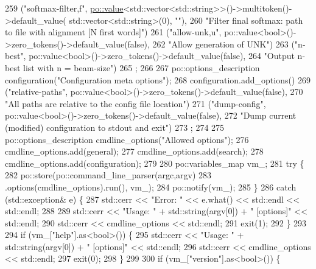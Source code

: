 \begin{DoxyCode}
259     (\textcolor{stringliteral}{"softmax-filter,f"}, \hyperlink{namespacemarian_1_1keywords_ac70de1b4c3cf6b7080cf5086f2963fd8}{po::value}<std::vector<std::string>>()->multitoken()->default\_value(
      std::vector<std::string>(0), \textcolor{stringliteral}{""}),
260      \textcolor{stringliteral}{"Filter final softmax: path to file with alignment [N first words]"})
261     (\textcolor{stringliteral}{"allow-unk,u"}, po::value<bool>()->zero\_tokens()->default\_value(\textcolor{keyword}{false}),
262      \textcolor{stringliteral}{"Allow generation of UNK"})
263     (\textcolor{stringliteral}{"n-best"}, po::value<bool>()->zero\_tokens()->default\_value(\textcolor{keyword}{false}),
264      \textcolor{stringliteral}{"Output n-best list with n = beam-size"})
265   ;
266 
267   po::options\_description configuration(\textcolor{stringliteral}{"Configuration meta options"});
268   configuration.add\_options()
269     (\textcolor{stringliteral}{"relative-paths"}, po::value<bool>()->zero\_tokens()->default\_value(\textcolor{keyword}{false}),
270      \textcolor{stringliteral}{"All paths are relative to the config file location"})
271     (\textcolor{stringliteral}{"dump-config"}, po::value<bool>()->zero\_tokens()->default\_value(\textcolor{keyword}{false}),
272      \textcolor{stringliteral}{"Dump current (modified) configuration to stdout and exit"})
273   ;
274 
275   po::options\_description cmdline\_options(\textcolor{stringliteral}{"Allowed options"});
276   cmdline\_options.add(general);
277   cmdline\_options.add(search);
278   cmdline\_options.add(configuration);
279 
280   po::variables\_map vm\_;
281   \textcolor{keywordflow}{try} \{
282     po::store(po::command\_line\_parser(argc,argv)
283               .options(cmdline\_options).run(), vm\_);
284     po::notify(vm\_);
285   \}
286   \textcolor{keywordflow}{catch} (std::exception& e) \{
287     std::cerr << \textcolor{stringliteral}{"Error: "} << e.what() << std::endl << std::endl;
288 
289     std::cerr << \textcolor{stringliteral}{"Usage: "} + std::string(argv[0]) +  \textcolor{stringliteral}{" [options]"} << std::endl;
290     std::cerr << cmdline\_options << std::endl;
291     exit(1);
292   \}
293 
294   \textcolor{keywordflow}{if} (vm\_[\textcolor{stringliteral}{"help"}].as<bool>()) \{
295     std::cerr << \textcolor{stringliteral}{"Usage: "} + std::string(argv[0]) +  \textcolor{stringliteral}{" [options]"} << std::endl;
296     std::cerr << cmdline\_options << std::endl;
297     exit(0);
298   \}
299 
300   \textcolor{keywordflow}{if} (vm\_[\textcolor{stringliteral}{"version"}].as<bool>()) \{

\end{DoxyCode}
